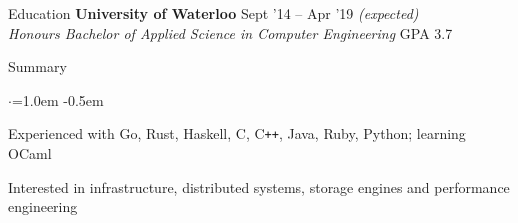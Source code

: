 \documentclass{resume} %
\begin{document}

\begin{rSection}{Education}
  {\bf University of Waterloo} \hfill {Sept '14 -- Apr '19 \em (expected)} \\
  {\em Honours Bachelor of Applied Science in Computer Engineering} \hfill {GPA 3.7}
  \vspace{0.5em}
\end{rSection}



\begin{rSection}{Summary}
  \vspace {0.5em}
  \begin{list}{$\cdot$}{\leftmargin=1.0em}
    \itemsep -0.5em \vspace{-0.5em}
    \item Experienced with Go, Rust, Haskell, C, C\texttt{++}, Java, Ruby, Python; learning OCaml
    \item Interested in infrastructure, distributed systems, storage engines
      and performance engineering
  \end{list}
  \vspace{0.5em}
\end{rSection}

\end{document}
